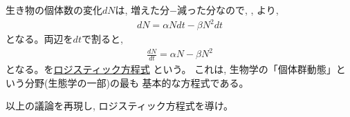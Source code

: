 生き物の個体数の変化$dN$は, 増えた分$-$減った分なので, 
, より, 
\begin{eqnarray}
dN=\alpha N dt -\beta N^2 dt\label{eq:numanal_8_Logistic2}
\end{eqnarray}
となる。両辺を$dt$で割ると, 
\begin{eqnarray}
\frac{dN}{dt}=\alpha N - \beta N^2\label{eq:logistic}
\end{eqnarray}
となる。を\underline{ロジスティック方程式}
という。
これは, 生物学の「個体群動態」という分野(生態学の一部)の最も
基本的な方程式である。
\mv

\begin{q}\label{q:Logistic_derive}
以上の議論を再現し, ロジスティック方程式を導け。
\end{q}
\mv

